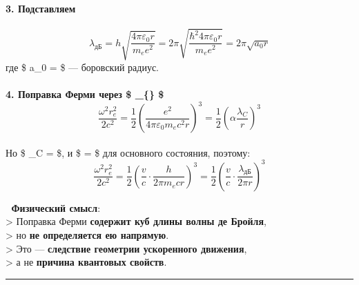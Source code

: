 \documentclass[11pt]{article}
\begin{document}
\paragraph{3.
Подставляем}\label{ux43fux43eux434ux441ux442ux430ux432ux43bux44fux435ux43c}

\[
\lambda_{\text{дБ}} = h \sqrt{\frac{4\pi\varepsilon_0 r}{m_e e^2}} = 2\pi \sqrt{\frac{\hbar^2 4\pi\varepsilon_0 r}{m_e e^2}} = 2\pi \sqrt{a_0 r}
\] где \$ a\_0 =  \$ ---
боровский радиус.

\paragraph{\texorpdfstring{4. Поправка Ферми через \$
\lambda\_\{\} \$ \[
\frac{\omega^2 r_e^2}{2c^2} = \frac{1}{2} \left( \frac{e^2}{4\pi\varepsilon_0 m_e c^2 r} \right)^3 = \frac{1}{2} \left( \alpha \frac{\lambda_C}{r} \right)^3
\]}{4. Поправка Ферми через \$ \_\{\} \$
\textbackslash{}frac\{\textbackslash{}omega\^{}2 r\_e\^{}2\}\{2c\^{}2\} = \textbackslash{}frac\{1\}\{2\} \textbackslash{}left( \textbackslash{}frac\{e\^{}2\}\{4\textbackslash{}pi\textbackslash{}varepsilon\_0 m\_e c\^{}2 r\} \textbackslash{}right)\^{}3 = \textbackslash{}frac\{1\}\{2\} \textbackslash{}left( \textbackslash{}alpha \textbackslash{}frac\{\textbackslash{}lambda\_C\}\{r\} \textbackslash{}right)\^{}3
}}\label{ux43fux43eux43fux440ux430ux432ux43aux430-ux444ux435ux440ux43cux438-ux447ux435ux440ux435ux437-_-fracomega2-r_e22c2-frac12-left-frace24pivarepsilon_0-m_e-c2-r-right3-frac12-left-alpha-fraclambda_cr-right3}

Но \$ \lambda\_C =  \$, и \$ \alpha = 
\$ для основного состояния, поэтому: \[
\frac{\omega^2 r_e^2}{2c^2} = \frac{1}{2} \left( \frac{v}{c} \cdot \frac{h}{2\pi m_e c r} \right)^3 = \frac{1}{2} \left( \frac{v}{c} \cdot \frac{\lambda_{\text{дБ}}}{2\pi r} \right)^3
\]

📌 \textbf{Физический смысл}:\\
\textgreater{} Поправка Ферми \textbf{содержит куб длины волны де
Бройля},\\
\textgreater{} но \textbf{не определяется ею напрямую}.\\
\textgreater{} Это --- \textbf{следствие геометрии ускоренного
движения},\\
\textgreater{} а не \textbf{причина квантовых свойств}.

\begin{center}\rule{0.5\linewidth}{\linethickness}\end{center}
\end{document}
